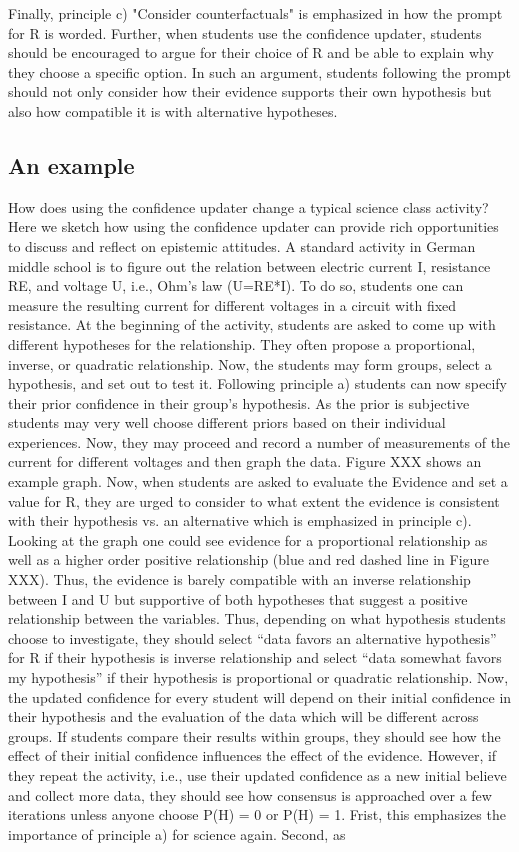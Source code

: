 Finally, principle c) "Consider counterfactuals" is emphasized in how the prompt for R is worded. Further, when students use the confidence updater, students should be encouraged to argue for their choice of R and be able to explain why they choose a specific option. In such an argument, students following the prompt should not only consider how their evidence supports their own hypothesis but also how compatible it is with alternative hypotheses. 

\subsection{An example}

How does using the confidence updater change a typical science class activity? Here we sketch how using the confidence updater can provide rich opportunities to discuss and reflect on epistemic attitudes. A standard activity in German middle school is to figure out the relation between electric current I, resistance RE, and voltage U, i.e., Ohm’s law (U=RE*I). To do so, students one can measure the resulting current for different voltages in a circuit with fixed resistance. At the beginning of the activity, students are asked to come up with different hypotheses for the relationship. They often propose a proportional, inverse, or quadratic relationship. Now, the students may form groups, select a hypothesis, and set out to test it. Following principle a) students can now specify their prior confidence in their group’s hypothesis. As the prior is subjective students may very well choose different priors based on their individual experiences. Now, they may proceed and record a number of measurements of the current for different voltages and then graph the data. Figure XXX shows an example graph. Now, when students are asked to evaluate the Evidence and set a value for R, they are urged to consider to what extent the evidence is consistent with their hypothesis vs. an alternative which is emphasized in principle c). Looking at the graph one could see evidence for a proportional relationship as well as a higher order positive relationship (blue and red dashed line in Figure XXX). Thus, the evidence is barely compatible with an inverse relationship between I and U but supportive of both hypotheses that suggest a positive relationship between the variables. Thus, depending on what hypothesis students choose to investigate, they should select “data favors an alternative hypothesis” for R if their hypothesis is inverse relationship and select “data somewhat favors my hypothesis” if their hypothesis is proportional or quadratic relationship. Now, the updated confidence for every student will depend on their initial confidence in their hypothesis and the evaluation of the data which will be different across groups. If students compare their results within groups, they should see how the effect of their initial confidence influences the effect of the evidence. However, if they repeat the activity, i.e., use their updated confidence as a new initial believe and collect more data, they should see how consensus is approached over a few iterations unless anyone choose P(H) = 0 or P(H) = 1.  Frist, this emphasizes the importance of principle a) for science again. Second, as 